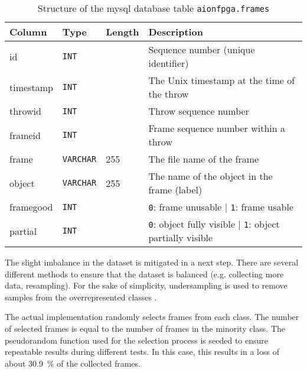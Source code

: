 \begin{table}
  \caption{Structure of the \acrshort{mysql} database table \texttt{aionfpga.frames}}
  \label{tab:tab_frames_structure}
  \centering
  \begin{tabular}{llll}
    \toprule
    \textbf{Column} & \textbf{Type} & \textbf{Length} & \textbf{Description} \\
    \midrule
    id & \texttt{INT} &  & Sequence number (unique identifier) \\
    timestamp & \texttt{INT} &  & The Unix timestamp at the time of the throw \\
    throwid & \texttt{INT} &  & Throw sequence number \\
    frameid & \texttt{INT} &  & Frame sequence number within a throw \\
    frame & \texttt{VARCHAR} & 255 & The file name of the frame \\
    object & \texttt{VARCHAR} & 255 & The name of the object in the frame (label) \\
    framegood & \texttt{INT} &  & \texttt{0}: frame unusable | \texttt{1}: frame usable \\
    partial & \texttt{INT} &  & \texttt{0}: object fully visible | \texttt{1}: object partially visible \\
    \bottomrule
  \end{tabular}
\end{table}

The slight imbalance in the dataset is mitigated in a next step.
There are several different methods to ensure that the dataset is balanced (e.g. collecting more data, resampling).
For the sake of simplicity, undersampling is used to remove samples from the overrepresented classes \cite{}. %

The actual implementation randomly selects frames from each class. %
The number of selected frames is equal to the number of frames in the minority class.
The pseudorandom function used for the selection process is seeded to ensure repeatable results during different tests.
In this case, this results in a loss of about \SI{30.9}{\percent} of the collected frames.

